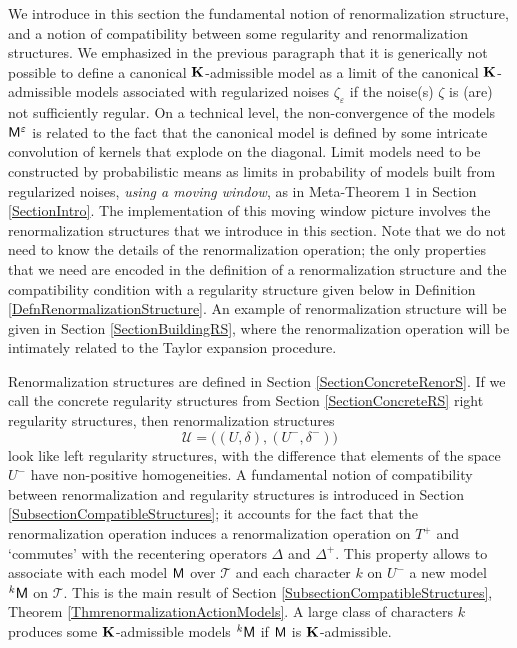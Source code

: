 \documentclass[10pt, reqno]{amsart}
\numberwithin{subsection}{section}
\numberwithin{subsubsection}{subsection}
\numberwithin{equation}{section} %
\theoremstyle{mystyle}
\theoremstyle{mystyle2}
\theoremstyle{mystyle3}
\renewcommand{\epsilon}{\varepsilon}
\begin{document}
We introduce in this section the fundamental notion of renormalization structure, and a notion of compatibility between some regularity and renormalization structures. We emphasized in the previous paragraph that it is generically not possible to define a canonical $\bf K$-admissible model as a limit of the canonical $\bf K$-admissible models associated with regularized noises $\zeta_\epsilon$ if the noise(s) $\zeta$ is (are) not sufficiently regular. On a technical level, the non-convergence of the models ${\sf M}^\epsilon$ is related to the fact that the canonical model is defined by some intricate convolution of kernels that explode on the diagonal. Limit models need to be constructed by probabilistic means as limits in probability of models built from regularized noises, \emph{using a moving window}, as in Meta-Theorem $1$ in Section \ref{SectionIntro}. The implementation of this moving window picture involves the renormalization structures that we introduce in this section. Note that we do not need to know the details of the renormalization operation; the only properties that we need are encoded in the definition of a   renormalization structure and the compatibility condition with a regularity structure given below in Definition \ref{DefnRenormalizationStructure}. An example of renormalization structure will be given in Section \ref{SectionBuildingRS}, where the renormalization operation will be intimately related to the Taylor expansion procedure. 

\medskip

Renormalization structures are defined in Section \ref{SectionConcreteRenorS}. If we call the concrete regularity structures from Section \ref{SectionConcreteRS} right regularity structures, then renormalization structures 
$$
\mathscr{U}=\big((U,\delta),(U^-,\delta^-)\big)
$$ 
look like left regularity structures, with the difference that elements of the space $U^-$ have non-positive homogeneities. A fundamental notion of compatibility between renormalization and regularity structures is introduced in Section \ref{SubsectionCompatibleStructures}; it accounts for the fact that the renormalization operation induces a renormalization operation on $T^+$ and `commutes' with the recentering operators $\Delta$ and $\Delta^+$. This property allows to associate with each model $\sf M$ over $\mathscr{T}$ and each character $k$ on $U^-$ a new model $^k{\sf M}$ on $\mathscr{T}$. This is the main result of Section \ref{SubsectionCompatibleStructures}, Theorem \ref{ThmrenormalizationActionModels}. A large class of characters $k$ produces some $\bf K$-admissible models $^k{\sf M}$ if $\sf M$ is $\bf K$-admissible.   
\end{document}

